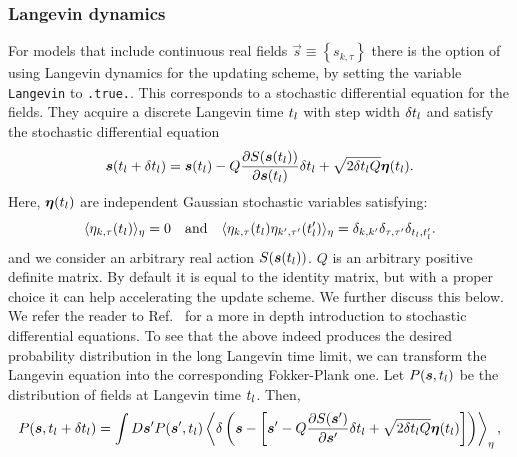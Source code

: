 

\subsubsection{Langevin dynamics}

For models that include continuous real fields $\vec{s} \equiv \left\{s_{k,\tau} \right\}$ there is the option of using Langevin dynamics for the updating scheme, by setting  the variable \texttt{Langevin} to \texttt{.true.}. This corresponds to a  stochastic differential equation for the fields. They acquire a discrete Langevin time $t_{l}$ with step width $\delta t_{l}$ and satisfy the stochastic differential equation
\begin{equation}\label{eqn:langevin}
   \boldsymbol{s}(t_{l} +  \delta t_{l})    =    \boldsymbol{s}(t_{l})    - Q \frac{\partial S( \boldsymbol{s}(t_{l})) }{\partial    \boldsymbol{s}(t_{l}) }    \delta t_{l}     +\sqrt{2 \delta t_{l} Q} \boldsymbol{\eta}(t_{l}).
\end{equation}
Here, $  \boldsymbol{\eta}(t_{l})  $   are  independent Gaussian  stochastic variables  satisfying:
\begin{equation}
        \langle  \eta_{k,\tau}(t_{l}) \rangle_{\eta}  = 0   \quad\text{and}\quad    \langle  \eta_{k,\tau}(t_{l})  \eta_{k',\tau'}(t_{l}') \rangle_{\eta}  = \delta_{k,k'} \delta_{\tau,\tau'} \delta_{t_{l},t_{l}'}.
\end{equation}
and we consider an arbitrary real action  $S( \boldsymbol{s}(t_{l}))$. $Q$ is an arbitrary positive definite matrix. By default it is equal to the identity matrix, but with a proper choice it can help accelerating the update scheme. We further discuss this below. 
We refer the reader to  Ref.~\cite{Gardiner}   for a more in depth introduction to stochastic differential equations.
To see that the above  indeed produces the desired probability distribution in the long Langevin time limit, we can transform the Langevin equation into the corresponding Fokker-Plank one.  Let
$P(\boldsymbol{s}, t_{l}) $ be the distribution of fields at Langevin time $t_{l}$. Then,
\begin{equation}
        P(\boldsymbol{s}, t_{l}  + \delta t_{l} )    = \int D\boldsymbol{s}'  P  (\boldsymbol{s}', t_{l}  )    \left\langle    \delta \left(  \boldsymbol{s} - \left[ \boldsymbol{s}'   - Q\frac{\partial S(\boldsymbol{s}' )}{\partial    \boldsymbol{s}' }   \delta t_{l}     +\sqrt{2 \delta t_{l} Q} \boldsymbol{\eta}(t_{l})  \right]    \right) \right\rangle_{\eta},
\end{equation}
